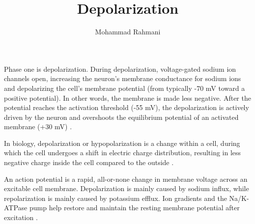 \documentclass[a4paper]{article}
\title{Depolarization}
\date{}
\author{Mohammad Rahmani}
\begin{document}
    \maketitle
    
    Phase one is depolarization. During depolarization, voltage-gated sodium ion channels open, increasing the neuron's membrane conductance for sodium ions and depolarizing the cell's membrane potential (from typically -70 mV toward a positive potential). In other words, the membrane is made less negative. After the potential reaches the activation threshold (-55 mV), the depolarization is actively driven by the neuron and overshoots the equilibrium potential of an activated membrane (+30 mV)
    .
    
    In biology, depolarization or hypopolarization is a change within a cell, during which the cell undergoes a shift in electric charge distribution, resulting in less negative charge inside the cell compared to the outside .
    
    An action potential is a rapid, all-or-none change in membrane voltage across an excitable cell membrane. Depolarization is mainly caused by sodium influx, while repolarization is mainly caused by potassium efflux. Ion gradients and the Na/K-ATPase pump help restore and maintain the resting membrane potential after excitation \cite{grider-2023-physiology-action-potential}.
    
    
    
\end{document}
